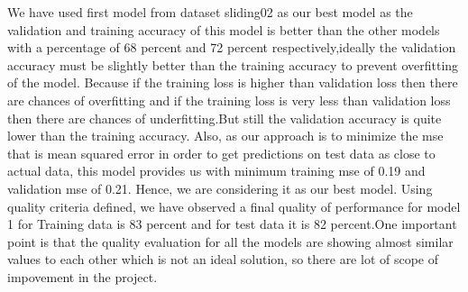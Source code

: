 \begin{table}
\centering
{}
\caption{ Quality Model for models with different hidden units for dataset sliding03}
\label{table:qualitymodelregression2}
\end{table}

We have used first model from dataset sliding02 as our best model as the  validation and training accuracy of this model is better than the other models with a percentage of 68 percent and 72 percent respectively,ideally the validation accuracy must be slightly better than the training accuracy to prevent overfitting of the model. Because if the training loss is higher than validation loss then there are chances of overfitting and if the training loss is very less than validation loss then there are chances of underfitting.But still the validation accuracy is quite lower than the training accuracy.\newline
Also, as our approach is to minimize the mse that is mean squared error in order to get predictions on test data as close to actual data, this model provides us with minimum training mse of 0.19 and validation mse of 0.21. Hence, we are considering it as our best model.\newline
Using quality criteria defined, we have observed a final quality of performance for model 1 for Training data is 83 percent and for test data it is 82 percent.One important point is that the quality evaluation for all the models are showing almost similar values to each other which is not an ideal solution, so there are lot of scope of impovement in the project.\newline

